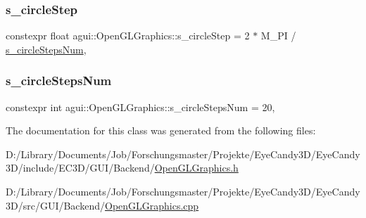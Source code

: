 \subsubsection{\texorpdfstring{s\+\_\+circle\+Step}{s\_circleStep}}
{\footnotesize\ttfamily constexpr float agui\+::\+Open\+G\+L\+Graphics\+::s\+\_\+circle\+Step = 2 $\ast$ M\+\_\+\+PI / \mbox{\hyperlink{classagui_1_1_open_g_l_graphics_a54efd9b25aaa7c9652c6640d13e1f4dd}{s\+\_\+circle\+Steps\+Num}}\hspace{0.3cm}{\ttfamily [static]}, {\ttfamily [protected]}}

\mbox{\label{classagui_1_1_open_g_l_graphics_a54efd9b25aaa7c9652c6640d13e1f4dd}} 
\subsubsection{\texorpdfstring{s\+\_\+circle\+Steps\+Num}{s\_circleStepsNum}}
{\footnotesize\ttfamily constexpr int agui\+::\+Open\+G\+L\+Graphics\+::s\+\_\+circle\+Steps\+Num = 20\hspace{0.3cm}{\ttfamily [static]}, {\ttfamily [protected]}}



The documentation for this class was generated from the following files\+:\begin{DoxyCompactItemize}
\item 
D\+:/\+Library/\+Documents/\+Job/\+Forschungsmaster/\+Projekte/\+Eye\+Candy3\+D/\+Eye\+Candy3\+D/include/\+E\+C3\+D/\+G\+U\+I/\+Backend/\mbox{\hyperlink{_open_g_l_graphics_8h}{Open\+G\+L\+Graphics.\+h}}\item 
D\+:/\+Library/\+Documents/\+Job/\+Forschungsmaster/\+Projekte/\+Eye\+Candy3\+D/\+Eye\+Candy3\+D/src/\+G\+U\+I/\+Backend/\mbox{\hyperlink{_open_g_l_graphics_8cpp}{Open\+G\+L\+Graphics.\+cpp}}\end{DoxyCompactItemize}
